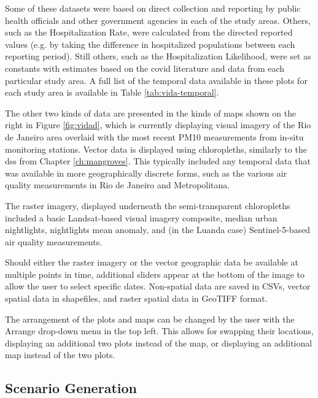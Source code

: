 Some of these datasets were based on direct collection and reporting by public health officials and other government agencies in each of the study areas. Others, such as the Hospitalization Rate, were calculated from the directed reported values (e.g. by taking the difference in hospitalized populations between each reporting period). Still others, such as the Hospitalization Likelihood, were set as constants with estimates based on the \ac{covid} literature and data from each particular study area. A full list of the temporal data available in these plots for each study area is available in Table \ref{tab:vida-temporal}.

The other two kinds of data are presented in the kinds of maps shown on the right in Figure \ref{fig:vidad}, which is currently displaying visual imagery of the Rio de Janeiro area overlaid with the most recent PM10 measurements from in-situ monitoring stations. Vector data is displayed using chloropleths, similarly to the \ac{dss} from Chapter \ref{ch:mangroves}. This typically included any temporal data that was available in more geographically discrete forms, such as the various air quality measurements in Rio de Janeiro and Metropolitana.

The raster imagery, displayed underneath the semi-transparent chloropleths included a basic Landsat-based visual imagery composite, median urban nightlights, nightlights mean anomaly, and (in the Luanda case) Sentinel-5-based air quality measurements.

Should either the raster imagery or the vector geographic data be available at multiple points in time, additional sliders appear at the bottom of the image to allow the user to select specific dates. Non-spatial data are saved in CSVs, vector spatial data in shapefiles, and raster spatial data in GeoTIFF format.

The arrangement of the plots and maps can be changed by the user with the Arrange drop-down menu in the top left. This allows for swapping their locations, displaying an additional two plots instead of the map, or displaying an additional map instead of the two plots.

\subsection{Scenario Generation}

